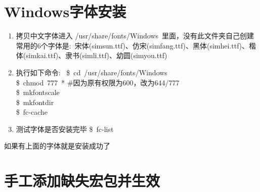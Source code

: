 \documentclass[10pt, oneside, a4paper]{article}      %
\begin{document}
\section{Windows字体安装}
\begin{enumerate}
	\item 拷贝中文字体进入 \textrm{/usr/share/fonts/Windows}~里面，没有此文件夹自己创建\\
		常用的6个字体是:~宋体(\textrm{simsun.ttf})、仿宋(\textrm{simfang.ttf})、黑体(\textrm{simhei.ttf})、楷体(\textrm{simkai.ttf})、隶书(\textrm{simli.ttf})、幼圆(\textrm{simyou.ttf})
	\item 执行如下命令:~
\$~\textrm{cd~/usr/share/fonts/Windows}\\
\$~\textrm{chmod~777~*} \#因为原有权限为600，改为644/777\\
\$~\textrm{mkfontscale}\\
\$~\textrm{mkfontdir}\\
\$~\textrm{fc-cache}
\item 测试字体是否安装完毕
	\$~\textrm{fc-list}
\end{enumerate}
如果有上面的字体就是安装成功了

\section{手工添加缺失宏包并生效}
\end{document}
